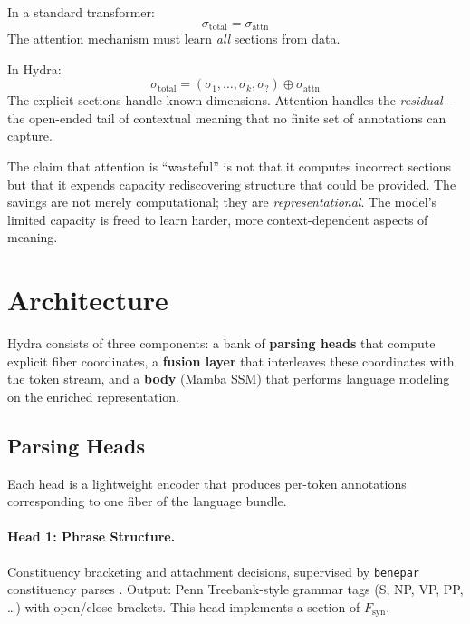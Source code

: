 \documentclass[11pt]{article}
\begin{document}
In a standard transformer:
\begin{equation}
\sigma_{\text{total}} = \sigma_{\text{attn}}
\end{equation}
The attention mechanism must learn \emph{all} sections from data.

In Hydra:
\begin{equation}
\sigma_{\text{total}} = (\sigma_1, \ldots, \sigma_k, \sigma_?) \oplus \sigma_{\text{attn}}
\end{equation}
The explicit sections handle known dimensions. Attention handles the 
\emph{residual}---the open-ended tail of contextual meaning that no 
finite set of annotations can capture.

The claim that attention is ``wasteful'' is not that it computes incorrect 
sections but that it expends capacity rediscovering structure that could be 
provided. The savings are not merely computational; they are \emph{representational}. 
The model's limited capacity is freed to learn harder, more context-dependent 
aspects of meaning.

\section{Architecture}
\label{sec:architecture}

Hydra consists of three components: a bank of \textbf{parsing heads} that 
compute explicit fiber coordinates, a \textbf{fusion layer} that interleaves 
these coordinates with the token stream, and a \textbf{body} (Mamba SSM) 
that performs language modeling on the enriched representation.

\subsection{Parsing Heads}

Each head is a lightweight encoder that produces per-token annotations 
corresponding to one fiber of the language bundle.

\paragraph{Head 1: Phrase Structure.}
Constituency bracketing and attachment decisions, supervised by 
\texttt{benepar} constituency parses \cite{kitaev2019multilingual}. 
Output: Penn Treebank-style grammar tags (S, NP, VP, PP, \ldots) with 
open/close brackets. This head implements a section of $F_{\text{syn}}$.
\end{document}
